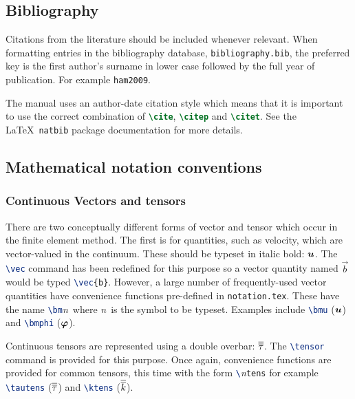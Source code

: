 \subsection{Bibliography}

Citations from the literature should be included whenever relevant. When
formatting entries in the bibliography database,
\lstinline[language=Bash]+bibliography.bib+, the preferred key is the first
author's surname in lower case followed by the full year of publication. For
example \lstinline[language=TeX]+ham2009+.

The manual uses an author-date citation style which means that it is
important to use the correct combination of
\lstinline[language=TeX]+\cite+,  \lstinline[language=TeX]+\citep+ and
\lstinline[language=TeX]+\citet+. See the \LaTeX\ \lstinline[language=TeX]+natbib+
 package documentation for more details.
\subsection{Mathematical notation conventions}

\subsubsection{Continuous Vectors and tensors}

There are two conceptually different forms of vector and tensor which occur
in the finite element method. The first is for quantities, such as velocity,
which are vector-valued in the continuum. These should be typeset in italic
bold: ${\mbox{\boldmath$u$}}$. The \lstinline[language=TeX]+\vec+ command has been redefined
for this purpose so a vector quantity named $\vec{b}$ would be typed
\lstinline[language=TeX]+\vec{b}+. However, a large number of
frequently-used vector quantities have convenience functions pre-defined in
\lstinline[language=bash]+notation.tex+. These have the name
\lstinline[language=TeX]+\bm+\textit{n}\ where \textit{n}\ is the symbol to
be typeset. Examples include \lstinline[language=TeX]+\bmu+ (${\mbox{\boldmath$u$}}$) and
\lstinline[language=TeX]+\bmphi+ (${\mbox{\boldmath$\varphi$}}$).

Continuous tensors are represented using a double overbar:
$\overline{\overline{\tau}}$. The \lstinline[language=TeX]+\tensor+ command is provided
for this purpose. Once again, convenience functions are provided for common
tensors, this time with the form
\lstinline[language=TeX]+\+\textit{n}\lstinline[language=TeX]+tens+ for
example \lstinline[language=TeX]+\tautens+ ($\overline{\overline{\tau}}$) and
\lstinline[language=TeX]+\ktens+ ($\overline{\overline{k}}$).


